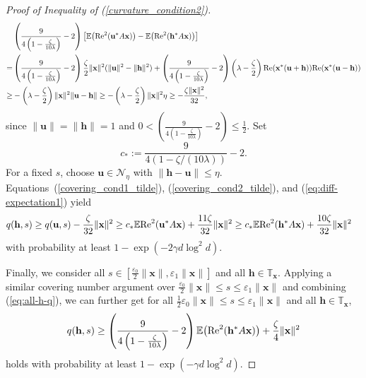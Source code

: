 \documentclass{article}
\renewcommand{\eqref}[1]{(\ref{#1})}
\newcommand{\E}{{\mathbb E}}
\newcommand{\calN}{{\mathcal N}}
\newcommand{\re}{{\rm Re}}
\newcommand{\vx}{{\mathbf x}}
\newcommand{\vu}{{\mathbf u}}
\newcommand{\vh}{{\mathbf h}}
\newcommand{\0}{{\mathbf 0}}
\numberwithin{equation}{section}
\begin{document}
\begin{proof}[Proof of Inequality of \eqref{curvature_condition2}]
	\begin{align}\label{eq:diff-expectation1}
		&\left(\frac{9}{4\left(1-\frac{\zeta}{10\lambda}\right)}-2\right)\left[\E\big(\re^2(\vu^*A\vx)\big)-\E\big(\re^2(\vh^*A\vx)\big)\right]\nonumber\\
		=&\left(\frac{9}{4\left(1-\frac{\zeta}{10\lambda}\right)}-2\right)\frac{\zeta}{2}\|\vx\|^2(\|\vu\|^2-\|\vh\|^2)+\left(\frac{9}{4\left(1-\frac{\zeta}{10\lambda}\right)}-2\right)\left(\lambda-\frac{\zeta}{2}\right)\re(\vx^*(\vu+\vh))\re(\vx^*(\vu-\vh))\nonumber\\
		\ge&-\left(\lambda-\frac{\zeta}{2}\right)\|\vx\|^2\|\vu-\vh\|\ge-\left(\lambda-\frac{\zeta}{2}\right)\|\vx\|^2\eta\ge-\frac{\zeta\|\vx\|^2}{32},
	\end{align}
	since $\|\vu\|=\|\vh\|=1$ and $0<\left(\frac{9}{4\left(1-\frac{\zeta}{10\lambda}\right)}-2\right)\le\frac{1}{2}$. 
	Set
	\[
	c_*:=\frac{9}{4(1-\zeta/(10\lambda))}-2.
	\]
	For a fixed $s$, choose $\vu\in\calN_\eta$ with $\|\vh-\vu\|\le\eta$.  Equations~\eqref{covering_cond1_tilde}, \eqref{covering_cond2_tilde}, and \eqref{eq:diff-expectation1} yield
	\begin{align}\label{eq:all-h-q}
		q(\vh,s)
		&\ge q(\vu,s)-\frac{\zeta}{32}\|\vx\|^2\ge c_*\E\re^2(\vu^*A\vx)+\frac{11\zeta}{32}\|\vx\|^2\ge c_*\E\re^2(\vh^*A\vx)+\frac{10\zeta}{32}\|\vx\|^2
	\end{align}
	with probability at least $1-\exp(-2\gamma d\log^2d)$. 
	
	\noindent
	Finally, we consider all $s\in[\frac{\varepsilon_0}{2}\|\vx\|,\varepsilon_1\|\vx\|]$ and all $\vh\in\mathbb T_{\vx}$. Applying a similar covering number argument over $ \frac{\varepsilon_0}{2}\|\vx\|\le s\leq \varepsilon_1\|\vx\| $ and combining \eqref{eq:all-h-q}, we can further get for all $ \frac{1}{2}\varepsilon_0\|\vx\|\le s\leq\varepsilon_1\|\vx\| $ and all $ \vh\in\mathbb T_{\vx} $, 
	$$ 
	q(\vh,s)\geq  \left(\frac{9}{4\left(1-\frac{\zeta}{10\lambda}\right)}-2\right)\E\big(\re^2(\vh^*A\vx)\big)+\frac{\zeta}{4} \|\vx\|^2
	$$ 
	holds with probability at least $ 1-\exp(-\gamma d\log^2d) $.
\end{proof}




\appendix
\end{document}
